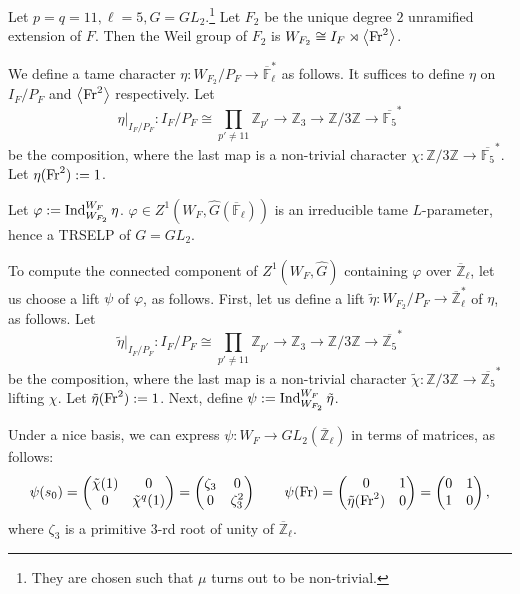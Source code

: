 \begin{eg}\label{Example: GL_2}
	
    Let $p=q=11, \ell=5, G=GL_2$.\footnote{They are chosen such that $\mu$ turns out to be non-trivial.} Let $F_2$ be the unique degree $2$ unramified extension of $F$. Then the Weil group of $F_2$ is $W_{F_2} \cong I_F \rtimes \left<\operatorname{Fr}^2\right>$.
    
    We define a tame character $\eta: W_{F_2}/P_F \to \overline{\mathbb{F}}_{\ell}^*$ as follows. It suffices to define $\eta$ on $I_F/P_F$ and $\left<\operatorname{Fr}^2\right>$ respectively.
    Let 
    $$\eta|_{I_F/P_F}: I_F/P_F \cong \prod_{p'\neq 11}\mathbb{Z}_{p'} \to \mathbb{Z}_3 \to \mathbb{Z}/3\mathbb{Z} \to \overline{\mathbb{F}_{5}}^*$$
    be the composition, where the last map is a non-trivial character $\chi: \mathbb{Z}/3\mathbb{Z} \to \overline{\mathbb{F}_{5}}^*$. Let $\eta(\operatorname{Fr}^2):=1$.
    
    Let $\varphi:=\operatorname{\operatorname{Ind}}_{W_{F_2}}^{W_F}\eta$. $\varphi \in Z^1(W_F, \hat{G}(\overline{\mathbb{F}}_{\ell}))$ is an irreducible tame $L$-parameter, hence a TRSELP of $G=GL_2$. 
    
    To compute the connected component of $Z^1(W_F, \hat{G})$ containing $\varphi$ over $\overline{\mathbb{Z}}_{\ell}$, let us choose a lift $\psi$ of $\varphi$, as follows. First, let us define a lift $\tilde{\eta}: W_{F_2}/P_F \to \overline{\mathbb{Z}}_{\ell}^*$ of $\eta$, as follows. Let 
    $$\tilde{\eta}|_{I_F/P_F}: I_F/P_F \cong \prod_{p'\neq 11}\mathbb{Z}_{p'} \to \mathbb{Z}_3 \to \mathbb{Z}/3\mathbb{Z} \to \overline{\mathbb{Z}_{5}}^*$$
    be the composition, where the last map is a non-trivial character $\tilde{\chi}: \mathbb{Z}/3\mathbb{Z} \to \overline{\mathbb{Z}_{5}}^*$ lifting $\chi$. Let $\tilde{\eta}(\operatorname{Fr}^2):=1$. Next, define $\psi:=\operatorname{\operatorname{Ind}}_{W_{F_2}}^{W_F}\tilde{\eta}$.
    
    Under a nice basis, we can express $\psi: W_F \to GL_2(\overline{\mathbb{Z}}_{\ell})$ in terms of matrices, as follows:
    $$\psi(s_0)=
    \begin{pmatrix}
    	\tilde{\chi}(1) & 0 \\
    	0 & \tilde{\chi}^q(1) \\
    \end{pmatrix}
    =
    \begin{pmatrix}
    	\zeta_3 & 0 \\
    	0 & \zeta_3^2 \\
    \end{pmatrix}\qquad 
    \psi(\operatorname{Fr})=
    \begin{pmatrix}
    	0 & 1 \\
    	\tilde{\eta}(\operatorname{Fr}^2) & 0 \\
    \end{pmatrix}
    =
    \begin{pmatrix}
    	0 & 1 \\
    	1 & 0 \\
    \end{pmatrix},
    $$
    where $\zeta_3$ is a primitive $3$-rd root of unity of $\overline{\mathbb{Z}}_{\ell}$.
    

\end{eg}
